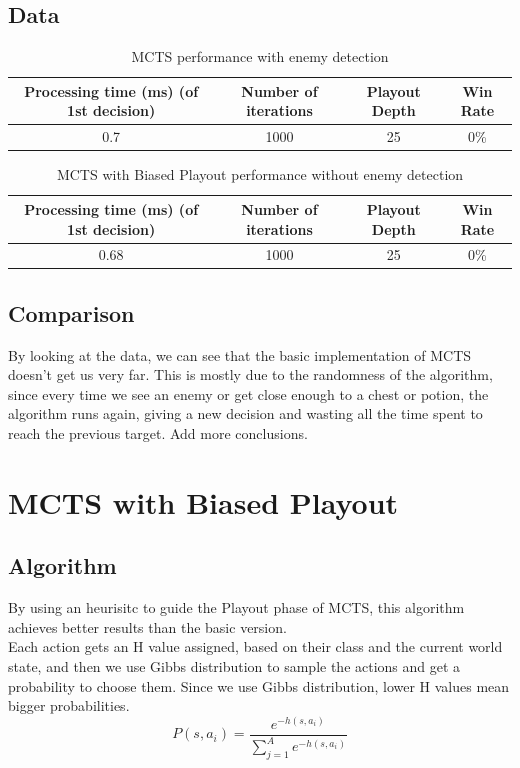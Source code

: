 \documentclass{article}
\begin{document}
  \subsection{Data}
  \begin{table}[h!]
    \centering
    \caption{MCTS performance with enemy detection}
    \label{tab:tableMCTS1}
    \begin{tabular}{c|c|c|c}
      \textbf{Processing time (ms) (of 1st decision)} & \textbf{Number of iterations} & \textbf{Playout Depth} & \textbf{Win Rate}\\
      \hline
      0.7 & 1000 & 25 & 0\%
    \end{tabular}
  \end{table}
  \begin{table}[h!]
    \centering
    \caption{MCTS with Biased Playout performance without enemy detection}
    \label{tab:tableMCTS2}
    \begin{tabular}{c|c|c|c}
      \textbf{Processing time (ms) (of 1st decision)} & \textbf{Number of iterations} & \textbf{Playout Depth} & \textbf{Win Rate}\\
      \hline
      0.68 & 1000 & 25 & 0\%
    \end{tabular}
  \end{table}

  \subsection{Comparison}
  By looking at the data, we can see that the basic implementation of MCTS doesn't get us very far. This is mostly due to the randomness of the algorithm, 
  since every time we see an enemy or get close enough to a chest or potion, the algorithm runs again, giving a new decision and wasting all 
  the time spent to reach the previous target.
  Add more conclusions.\\

  \section{MCTS with Biased Playout}
  \subsection{Algorithm}
  By using an heurisitc to guide the Playout phase of MCTS, this algorithm achieves better results than the basic version.\\
  Each action gets an H value assigned, based on their class and the current world state, and then we use Gibbs distribution to sample the actions and get a probability to choose them. 
  Since we use Gibbs distribution, lower H values mean bigger probabilities.\\
  \[P(s,a_i) = \frac{e^{-h(s, a_i)}}{\sum_{j=1}^{A}e^{-h(s, a_i)}}\]
  
\end{document}
